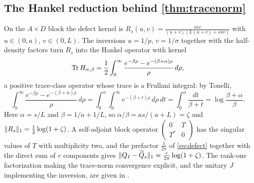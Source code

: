 \subsection{The Hankel reduction behind \texorpdfstring{\cref{thm:tracenorm}}{the trace-norm identity}}
\label{app:hankel}
On the $A\times D$ block the defect kernel is
$R_s(u,v)=\frac{suv}{(u+v)(L(u+v)+suv)}$ with $u\in(0,a)$, $v\in(0,L)$.  The
inversions $u=1/p$, $v=1/\sigma$ together with the half-density factors turn
$R_s$ into the Hankel operator with kernel
\begin{equation}\label{eq:hankel}
 \operatorname{Tr} H_{\alpha,\beta}
 =\frac12\int_0^\infty\frac{e^{-\beta\rho}-e^{-(\beta+\alpha)\rho}}{\rho}\,d\rho,
\end{equation}
a positive trace-class operator whose trace is a Frullani integral: by Tonelli,
\begin{equation}\label{eq:frullani}
 \int_0^\infty\frac{e^{-\beta\rho}-e^{-(\beta+\alpha)\rho}}{\rho}\,d\rho
 =\int_0^\alpha\!\!\int_0^\infty e^{-(\beta+t)\rho}\,d\rho\,dt
 =\int_0^\alpha\frac{dt}{\beta+t}=\log\frac{\beta+\alpha}\beta .
\end{equation}
Here $\alpha=s/L$ and $\beta=1/a+1/L$, so $\alpha/\beta=as/(a+L)=\zeta$ and
$\lVert R_s\rVert_1=\frac12\log(1+\zeta)$.  A self-adjoint block operator
$\left(\begin{smallmatrix}0&T\\T^*&0\end{smallmatrix}\right)$ has the singular
values of $T$ with multiplicity two, and the prefactor $\frac1{2\pi}$ of
\eqref{eq:defect} together with the direct sum of $r$ components gives
$\lVert Q_I-\widetilde Q_s\rVert_1=\frac r{2\pi}\log(1+\zeta)$.  The rank-one
factorization making the trace-norm convergence explicit, and the unitary
$J$ implementing the inversion, are given in \cite[\S6]{Note4}.

